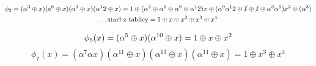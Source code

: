 \documentclass[12pt]{article}
\begin{document}
\begin{multline*}
    \phi_3 = (\alpha^3 \oplus x) (a^6 \oplus x)(\alpha^9 \oplus x)(\alpha^12 \oplus x)  
    = 1 \oplus (\alpha^3 \oplus \alpha ^6 \oplus \alpha^9 \oplus \alpha^12)x 
    \oplus (\alpha^9 \alpha^12 \oplus \cancel{1} \oplus \cancel{1} \oplus \alpha^3 
    \alpha ^6)x^2 \oplus (\alpha^3 ) \\ 
    \dots \text{starł z tablicy}  = 1 \oplus x \oplus x^2 \oplus x^3 \oplus x^4
\end{multline*}

 $$   \phi_5(x) = (\alpha^5 \oplus x)(\alpha^{10} \oplus x) = 1 \oplus x \oplus  x^2 \\ $$
 $$   \phi_7(x) = (\alpha^7 \alpha x)(\alpha^11 \oplus x)(\alpha^13 \oplus x)(\alpha^11 \oplus x) = 1\oplus x^3 \oplus x^4 $$
\end{document}
